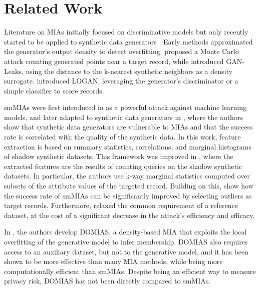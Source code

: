 \section{Related Work}
Literature on MIAs initially focused on discriminative models \citep{shokri2017membership} but only recently started to be applied to synthetic data generators \citep{stadler2022synthetic, hu2022membership}.
Early methods approximated the generator's output density to detect overfitting. \citet{hilprecht2019monte} proposed a Monte Carlo attack counting generated points near a target record, while \citet{chen2020gan} introduced GAN-Leaks, using the distance to the k-nearest synthetic neighbors as a density surrogate. \citet{hayes2019logan} introduced LOGAN, leveraging the generator's discriminator or a simple classifier to score records.

smMIAs were first introduced in \citet{shokri2017membership} as a powerful attack against machine learning models, and later adapted to synthetic data generators in \citet{stadler2022synthetic}, where the authors show that synthetic data generators are vulnerable to MIAs and that the success rate is correlated with the quality of the synthetic data. In this work, feature extraction is based on summary statistics, correlations, and marginal histograms of shadow synthetic datasets.
This framework was improved in \citet{houssiau2022tapas}, where the extracted features are the results of counting queries on the shadow synthetic datasets. In particular, the authors use k-way marginal statistics computed over subsets of the attribute values of the targeted record.
Building on this, \citet{meeus2023achilles} show how the success rate of smMIAs can be significantly improved by selecting outliers as target records.
Furthermore, \citet{guepin2023synthetic} relaxed the common requirement of a reference dataset, at the cost of a significant decrease in the attack's efficiency and efficacy.

In \citet{van2023membership}, the authors develop DOMIAS, a density-based MIA that exploits the local overfitting of the generative model to infer membership. DOMIAS also requires access to an auxiliary dataset, but not to the generative model, and it has been shown to be more effective than many MIA methods, while being more computationally efficient than smMIAs. Despite being an efficient way to measure privacy risk, DOMIAS has not been directly compared to smMIAs.
